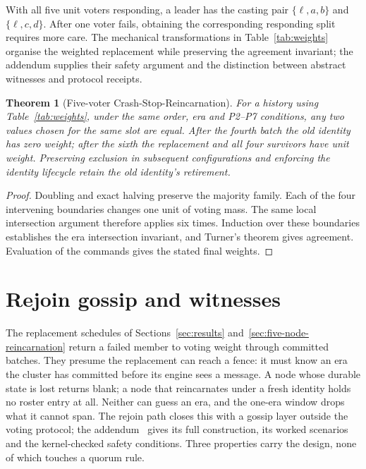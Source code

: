 \documentclass[10pt,journal,letterpaper]{IEEEtran}
\newtheorem{theorem}{Theorem}
\begin{document}
With all five unit voters responding, a leader has the casting pair $\{\ell,a,b\}$ and $\{\ell,c,d\}$. After one voter fails, obtaining the corresponding responding split requires more care. The mechanical transformations in Table~\ref{tab:weights} organise the weighted replacement while preserving the agreement invariant; the addendum supplies their safety argument and the distinction between abstract witnesses and protocol receipts.

\begin{theorem}[Five-voter Crash-Stop-Reincarnation]\label{thm:replacement}
For a history using Table~\ref{tab:weights}, under the same order, era and P2--P7 conditions, any two values chosen for the same slot are equal. After the fourth batch the old identity has zero weight; after the sixth the replacement and all four survivors have unit weight. Preserving exclusion in subsequent configurations and enforcing the identity lifecycle retain the old identity's retirement.
\end{theorem}
\begin{proof}
Doubling and exact halving preserve the majority family. Each of the four intervening boundaries changes one unit of voting mass. The same local intersection argument therefore applies six times. Induction over these boundaries establishes the era intersection invariant, and Turner's theorem gives agreement. Evaluation of the commands gives the stated final weights.
\end{proof}

\section{Rejoin gossip and witnesses}\label{sec:rejoin-gossip}
The replacement schedules of Sections~\ref{sec:results}
and~\ref{sec:five-node-reincarnation} return a failed member to voting
weight through committed batches. They presume the replacement can reach a
fence: it must know an era the cluster has committed before its engine sees
a message. A node whose durable state is lost returns blank; a node that
reincarnates under a fresh identity holds no roster entry at all. Neither
can guess an era, and the one-era window drops what it cannot
span. The rejoin path closes this with a gossip layer outside the voting
protocol; the addendum~\cite{artifact} gives its full construction, its
worked scenarios and the kernel-checked safety conditions. Three properties
carry the design, none of which touches a quorum rule.
\end{document}
